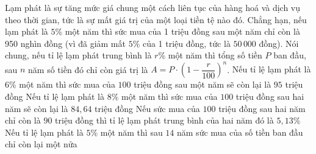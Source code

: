 \begin{ex}%
	Lạm phát là sự tăng mức giá chung một cách liên tục của hàng hoá và dịch vụ theo thời gian, tức là sự mất giá trị của một loại tiền tệ  nào đó. Chẳng hạn, nếu lạm phát là $ 5$\% một năm thì sức mua của 1 triệu đồng sau một năm chỉ còn là 950 nghìn đồng (vì đã giảm mất $ 5$\% của 1 triệu đồng, tức là $50\,000$ đồng). Nói chung, nếu tỉ lệ lạm phát trung bình là $ r$\% một năm thì tổng số tiền $ P$ ban đầu, sau $ n$ năm số tiền đó chỉ còn giá trị là $ A=P\cdot{\left(1-\dfrac{r}{100}\right)^n}$.
	\choiceTF 
		{Nếu tỉ lệ lạm phát là  $6$\% một năm thì sức mua của $100$ triệu đồng sau một năm sẽ còn lại là $95$ triệu đồng}
		{\True Nếu tỉ lệ lạm phát là $8$\% một năm thì sức mua của $100$  triệu đồng sau hai năm sẽ còn lại là $84{,}64$ triệu đồng}
		{\True Nếu sức mua của $100$ triệu đồng sau hai năm chỉ còn là $90$ triệu đồng thì tỉ lệ lạm phát trung bình của hai năm đó là $5{,}13$\%} 
		{\True Nếu tỉ lệ lạm phát  là $5$\% một năm thì sau $14$ năm sức mua của số tiền ban đầu chỉ còn lại một nửa}
\end{ex}


